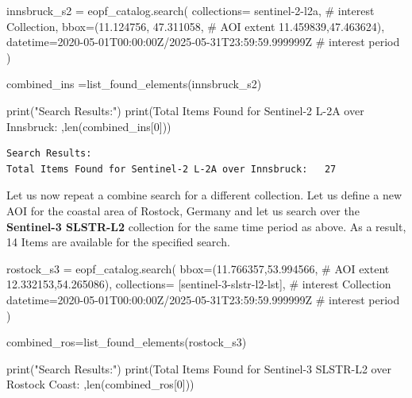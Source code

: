 \documentclass[
  letterpaper,
  DIV=11,
  numbers=noendperiod]{scrreprt}
\newenvironment{Shaded}{\begin{snugshade}}{\end{snugshade}}
\newcommand{\BuiltInTok}[1]{\textcolor[rgb]{0.00,0.23,0.31}{#1}}
\newcommand{\CommentTok}[1]{\textcolor[rgb]{0.37,0.37,0.37}{#1}}
\newcommand{\DecValTok}[1]{\textcolor[rgb]{0.68,0.00,0.00}{#1}}
\newcommand{\FloatTok}[1]{\textcolor[rgb]{0.68,0.00,0.00}{#1}}
\newcommand{\NormalTok}[1]{\textcolor[rgb]{0.00,0.23,0.31}{#1}}
\newcommand{\OperatorTok}[1]{\textcolor[rgb]{0.37,0.37,0.37}{#1}}
\newcommand{\StringTok}[1]{\textcolor[rgb]{0.13,0.47,0.30}{#1}}
\begin{document}
\begin{Shaded}
\begin{Highlighting}[]
\NormalTok{innsbruck\_s2 }\OperatorTok{=}\NormalTok{ eopf\_catalog.search( }
\NormalTok{    collections}\OperatorTok{=} \StringTok{\textquotesingle{}sentinel{-}2{-}l2a\textquotesingle{}}\NormalTok{, }\CommentTok{\# interest Collection,}
\NormalTok{    bbox}\OperatorTok{=}\NormalTok{(}\FloatTok{11.124756}\NormalTok{, }\FloatTok{47.311058}\NormalTok{, }\CommentTok{\# AOI extent}
          \FloatTok{11.459839}\NormalTok{,}\FloatTok{47.463624}\NormalTok{),}
\NormalTok{    datetime}\OperatorTok{=}\StringTok{\textquotesingle{}2020{-}05{-}01T00:00:00Z/2025{-}05{-}31T23:59:59.999999Z\textquotesingle{}} \CommentTok{\# interest period}
\NormalTok{)}

\NormalTok{combined\_ins }\OperatorTok{=}\NormalTok{list\_found\_elements(innsbruck\_s2)}

\BuiltInTok{print}\NormalTok{(}\StringTok{"Search Results:"}\NormalTok{)}
\BuiltInTok{print}\NormalTok{(}\StringTok{\textquotesingle{}Total Items Found for Sentinel{-}2 L{-}2A over Innsbruck:  \textquotesingle{}}\NormalTok{,}\BuiltInTok{len}\NormalTok{(combined\_ins[}\DecValTok{0}\NormalTok{]))}
\end{Highlighting}
\end{Shaded}

\begin{verbatim}
Search Results:
Total Items Found for Sentinel-2 L-2A over Innsbruck:   27
\end{verbatim}

Let us now repeat a combine search for a different collection. Let us
define a new AOI for the coastal area of Rostock, Germany and let us
search over the \textbf{Sentinel-3 SLSTR-L2} collection for the same
time period as above. As a result, 14 Items are available for the
specified search.

\begin{Shaded}
\begin{Highlighting}[]
\NormalTok{rostock\_s3 }\OperatorTok{=}\NormalTok{ eopf\_catalog.search(}
\NormalTok{    bbox}\OperatorTok{=}\NormalTok{(}\FloatTok{11.766357}\NormalTok{,}\FloatTok{53.994566}\NormalTok{, }\CommentTok{\# AOI extent}
          \FloatTok{12.332153}\NormalTok{,}\FloatTok{54.265086}\NormalTok{),}
\NormalTok{    collections}\OperatorTok{=}\NormalTok{ [}\StringTok{\textquotesingle{}sentinel{-}3{-}slstr{-}l2{-}lst\textquotesingle{}}\NormalTok{], }\CommentTok{\# interest Collection}
\NormalTok{    datetime}\OperatorTok{=}\StringTok{\textquotesingle{}2020{-}05{-}01T00:00:00Z/2025{-}05{-}31T23:59:59.999999Z\textquotesingle{}} \CommentTok{\# interest period}
\NormalTok{)}

\NormalTok{combined\_ros}\OperatorTok{=}\NormalTok{list\_found\_elements(rostock\_s3)}

\BuiltInTok{print}\NormalTok{(}\StringTok{"Search Results:"}\NormalTok{)}
\BuiltInTok{print}\NormalTok{(}\StringTok{\textquotesingle{}Total Items Found for Sentinel{-}3 SLSTR{-}L2 over Rostock Coast:  \textquotesingle{}}\NormalTok{,}\BuiltInTok{len}\NormalTok{(combined\_ros[}\DecValTok{0}\NormalTok{]))}
\end{Highlighting}
\end{Shaded}
\end{document}
